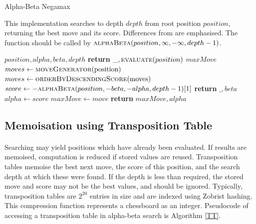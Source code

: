 \documentclass[12pt,a4paper]{book}
\begin{document}
\begin{algorithm}
  \caption{Alpha-Beta Negamax}\label{ABNegamax}
  This implementation searches to depth $depth$ from root position $position$, returning the best move and its score. Differences from  are emphasised. The function should be called by $\Call{alphaBeta}{position, \infty, -\infty, depth-1}$.
  \begin{algorithmic}[1]
    \color{gray}
     {$position, alpha, beta, depth$}
    \State \textbf{return} $\_, \Call{evaluate}{position}$
    \EndIf
    \State $maxMove$
    \color{black}
    \State $moves \gets \Call{moveGenerator}{$position$}$
    \State $moves \gets \Call{orderByDescendingScore}{$moves$}$
    \color{gray}
    \State {}
    \State $score \gets -\Call{alphaBeta}{position, -beta, -alpha, depth-1}[1]$
    \State {}
	\color{black}
    \State \textbf{return} $\_, beta$
	\EndIf
    \State $alpha \gets score$
    \State $maxMove \gets move$
	\EndIf
    \EndFor
    \color{gray}
    \State \textbf{return} $maxMove, alpha$
    \EndFunction
  \end{algorithmic}
\end{algorithm}

\subsection{Memoisation using Transposition Table}

\paragraph{} Searching may yield positions which have already been evaluated. If results are memoised, computation is reduced if stored values are reused. Transposition tables memoise the best next move, the score of this position, and the search depth at which these were found. If the depth is less than required, the stored move and score may not be the best values, and should be ignored. Typically, transposition tables are $2^{20}$ entries in size and are indexed using Zobrist hashing. This compression function represents a chessboard as an integer. \cite{carolus} Pseudocode of accessing a transposition table in alpha-beta search is Algorithm \ref{TT}.
\end{document}
